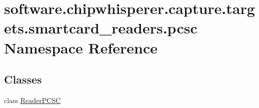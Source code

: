 \hypertarget{namespacesoftware_1_1chipwhisperer_1_1capture_1_1targets_1_1smartcard__readers_1_1pcsc}{}\section{software.\+chipwhisperer.\+capture.\+targets.\+smartcard\+\_\+readers.\+pcsc Namespace Reference}
\label{namespacesoftware_1_1chipwhisperer_1_1capture_1_1targets_1_1smartcard__readers_1_1pcsc}
\subsection*{Classes}
\begin{DoxyCompactItemize}
\item 
class \hyperlink{classsoftware_1_1chipwhisperer_1_1capture_1_1targets_1_1smartcard__readers_1_1pcsc_1_1ReaderPCSC}{Reader\+P\+C\+S\+C}
\end{DoxyCompactItemize}
